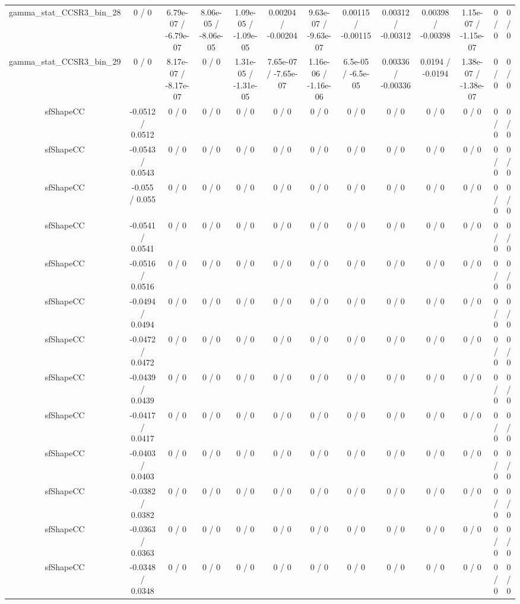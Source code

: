 \documentclass[10pt]{article}
\begin{document}
\begin{table}[htbp]
\begin{center}
\begin{tabular}{|c|c|c|c|c|c|c|c|c|c|c|c|c|}
  gamma_stat_CCSR3_bin_28 & 0 / 0 & 6.79e-07 / -6.79e-07 & 8.06e-05 / -8.06e-05 & 1.09e-05 / -1.09e-05 & 0.00204 / -0.00204 & 9.63e-07 / -9.63e-07 & 0.00115 / -0.00115 & 0.00312 / -0.00312 & 0.00398 / -0.00398 & 1.15e-07 / -1.15e-07 & 0 / 0 & 0 / 0 \\ 
  gamma_stat_CCSR3_bin_29 & 0 / 0 & 8.17e-07 / -8.17e-07 & 0 / 0 & 1.31e-05 / -1.31e-05 & 7.65e-07 / -7.65e-07 & 1.16e-06 / -1.16e-06 & 6.5e-05 / -6.5e-05 & 0.00336 / -0.00336 & 0.0194 / -0.0194 & 1.38e-07 / -1.38e-07 & 0 / 0 & 0 / 0 \\ 
  sfShapeCC & -0.0512 / 0.0512 & 0 / 0 & 0 / 0 & 0 / 0 & 0 / 0 & 0 / 0 & 0 / 0 & 0 / 0 & 0 / 0 & 0 / 0 & 0 / 0 & 0 / 0 \\ 
  sfShapeCC & -0.0543 / 0.0543 & 0 / 0 & 0 / 0 & 0 / 0 & 0 / 0 & 0 / 0 & 0 / 0 & 0 / 0 & 0 / 0 & 0 / 0 & 0 / 0 & 0 / 0 \\ 
  sfShapeCC & -0.055 / 0.055 & 0 / 0 & 0 / 0 & 0 / 0 & 0 / 0 & 0 / 0 & 0 / 0 & 0 / 0 & 0 / 0 & 0 / 0 & 0 / 0 & 0 / 0 \\ 
  sfShapeCC & -0.0541 / 0.0541 & 0 / 0 & 0 / 0 & 0 / 0 & 0 / 0 & 0 / 0 & 0 / 0 & 0 / 0 & 0 / 0 & 0 / 0 & 0 / 0 & 0 / 0 \\ 
  sfShapeCC & -0.0516 / 0.0516 & 0 / 0 & 0 / 0 & 0 / 0 & 0 / 0 & 0 / 0 & 0 / 0 & 0 / 0 & 0 / 0 & 0 / 0 & 0 / 0 & 0 / 0 \\ 
  sfShapeCC & -0.0494 / 0.0494 & 0 / 0 & 0 / 0 & 0 / 0 & 0 / 0 & 0 / 0 & 0 / 0 & 0 / 0 & 0 / 0 & 0 / 0 & 0 / 0 & 0 / 0 \\ 
  sfShapeCC & -0.0472 / 0.0472 & 0 / 0 & 0 / 0 & 0 / 0 & 0 / 0 & 0 / 0 & 0 / 0 & 0 / 0 & 0 / 0 & 0 / 0 & 0 / 0 & 0 / 0 \\ 
  sfShapeCC & -0.0439 / 0.0439 & 0 / 0 & 0 / 0 & 0 / 0 & 0 / 0 & 0 / 0 & 0 / 0 & 0 / 0 & 0 / 0 & 0 / 0 & 0 / 0 & 0 / 0 \\ 
  sfShapeCC & -0.0417 / 0.0417 & 0 / 0 & 0 / 0 & 0 / 0 & 0 / 0 & 0 / 0 & 0 / 0 & 0 / 0 & 0 / 0 & 0 / 0 & 0 / 0 & 0 / 0 \\ 
  sfShapeCC & -0.0403 / 0.0403 & 0 / 0 & 0 / 0 & 0 / 0 & 0 / 0 & 0 / 0 & 0 / 0 & 0 / 0 & 0 / 0 & 0 / 0 & 0 / 0 & 0 / 0 \\ 
  sfShapeCC & -0.0382 / 0.0382 & 0 / 0 & 0 / 0 & 0 / 0 & 0 / 0 & 0 / 0 & 0 / 0 & 0 / 0 & 0 / 0 & 0 / 0 & 0 / 0 & 0 / 0 \\ 
  sfShapeCC & -0.0363 / 0.0363 & 0 / 0 & 0 / 0 & 0 / 0 & 0 / 0 & 0 / 0 & 0 / 0 & 0 / 0 & 0 / 0 & 0 / 0 & 0 / 0 & 0 / 0 \\ 
  sfShapeCC & -0.0348 / 0.0348 & 0 / 0 & 0 / 0 & 0 / 0 & 0 / 0 & 0 / 0 & 0 / 0 & 0 / 0 & 0 / 0 & 0 / 0 & 0 / 0 & 0 / 0 \\ 

\end{tabular}
\end{center}
\end{table}
\end{document}
